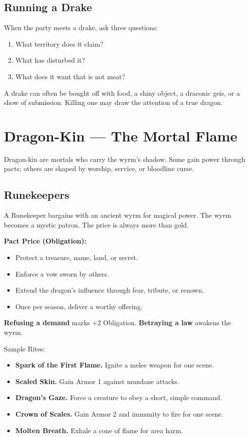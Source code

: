 \subsection*{Running a Drake}

When the party meets a drake, ask three questions:

\begin{enumerate}
  \item What territory does it claim?
  \item What has disturbed it?
  \item What does it want that is not meat?
\end{enumerate}

A drake can often be bought off with food, a shiny object, a draconic geis, or a show of submission. Killing one may draw the attention of a true dragon.

\section{Dragon-Kin --- The Mortal Flame}

Dragon-kin are mortals who carry the wyrm's shadow. Some gain power through pacts; others are shaped by worship, service, or bloodline curse.

\subsection*{Runekeepers}

A Runekeeper bargains with an ancient wyrm for magical power. The wyrm becomes a mystic patron. The price is always more than gold.

\noindent
\textbf{Pact Price (Obligation):}
\begin{itemize}
  \item Protect a treasure, name, land, or secret.
  \item Enforce a vow sworn by others.
  \item Extend the dragon's influence through fear, tribute, or renown.
  \item Once per season, deliver a worthy offering.
\end{itemize}

\noindent
\textbf{Refusing a demand} marks $+2$ Obligation. \textbf{Betraying a law} awakens the wyrm.

Sample Rites:
\begin{itemize}
  \item \textbf{Spark of the First Flame.} Ignite a melee weapon for one scene.
  \item \textbf{Scaled Skin.} Gain Armor 1 against mundane attacks.
  \item \textbf{Dragon's Gaze.} Force a creature to obey a short, simple command.
  \item \textbf{Crown of Scales.} Gain Armor 2 and immunity to fire for one scene.
  \item \textbf{Molten Breath.} Exhale a cone of flame for area harm.
\end{itemize}

